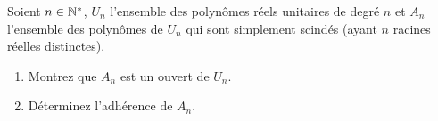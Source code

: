 \begin{corr}
\end{corr}

\begin{exo}[Oral X, 7]
Soient \(n\in\mathbb{N}^*\), \(U_n\) l'ensemble des polynômes réels unitaires de degré \(n\) et \(A_n\) l'ensemble des polynômes de \(U_n\) qui sont simplement scindés (\ie ayant \(n\) racines réelles distinctes).

\begin{enumerate}
    \item Montrez que \(A_n\) est un ouvert de \(U_n\). \\
    \item Déterminez l'adhérence de \(A_n\).
\end{enumerate}
\end{exo}

\begin{corr}
\end{corr}